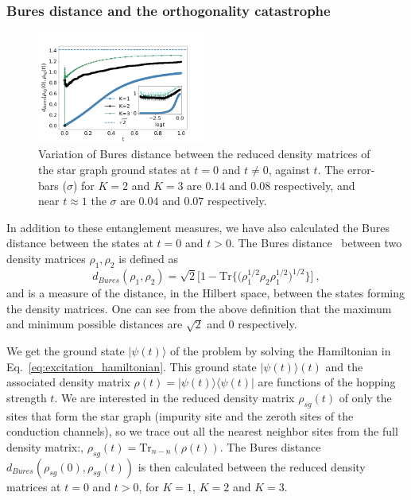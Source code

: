 \documentclass[reprint,prb,superscriptaddress]{revtex4-2}
\begin{document}
\subsubsection{Bures distance and the orthogonality catastrophe}
\begin{figure}[!htpb]
\includegraphics[width=0.49\textwidth]{errorBuresDistanceCh12310001}
\caption{Variation of Bures distance between the reduced density matrices of the star graph ground states at $t=0$ and $t\neq 0$, against $t$. The error-bars ($\sigma$) for \(K=2\) and \(K=3\) are $0.14$ and $0.08$ respectively, and near $t\approx 1$ the $\sigma$ are $0.04$ and $0.07$ respectively.}
\label{fig:bures_distance}
\end{figure}
In addition to these entanglement measures, we have also calculated the Bures distance between the states at \(t=0\) and \(t>0\). The Bures distance~\cite{uhlmann1976transition,bures1969extension,hubner1992explicit,hubner1993computation,dittmann1994some,marian2003bures} between two density matrices \(\rho_1,\rho_2\) is defined as 
\begin{equation}
d_{Bures}(\rho_1,\rho_2) = \sqrt{2} \bigg[1- \textrm{Tr}\bigg\{ \bigg(\rho_1^{1/2}  \rho_2 \rho_{1}^{1/2}\bigg)^{1/2} \bigg\}\bigg]~,
\end{equation}
and is a measure of the distance, in the Hilbert space, between the states forming the density matrices. One can see from the above definition that the maximum and minimum possible distances are $\sqrt{2}$ and $0$ respectively.
\par We get the ground state $|\psi(t)\rangle$ of the problem by solving the Hamiltonian in Eq.~\eqref{eq:excitation_hamiltonian}. This ground state $|\psi(t)\rangle(t)$ and the associated density matrix $\rho(t)= |\psi(t)\rangle \langle \psi(t)|$ are functions of the hopping strength \(t\). We are interested in the reduced density matrix $\rho_{sg}(t)$ of only the sites that form the star graph (impurity site and the zeroth sites of the conduction channels), so we trace out all the nearest neighbor sites from the full density matrix:, $\rho_{sg}(t)=\textrm{Tr}_{n-n}(\rho(t))$. The Bures distance $d_{Bures}(\rho_{sg}(0),\rho_{sg}(t))$ is then calculated between the reduced density matrices at \(t=0\) and \(t > 0\), for \(K=1\), \(K=2\) and \(K=3\).
\end{document}
